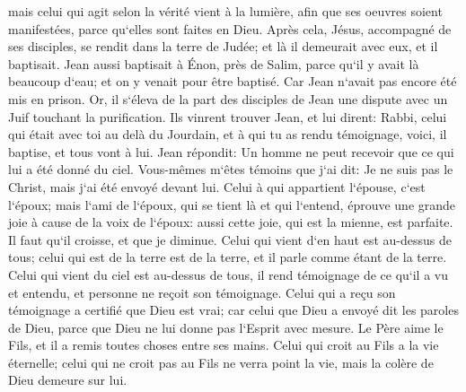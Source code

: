 \verse mais celui qui agit selon la vérité vient à la lumière, afin que ses oeuvres soient manifestées, parce qu`elles sont faites en Dieu. 
\verse Après cela, Jésus, accompagné de ses disciples, se rendit dans la terre de Judée; et là il demeurait avec eux, et il baptisait. 
\verse Jean aussi baptisait à Énon, près de Salim, parce qu`il y avait là beaucoup d`eau; et on y venait pour être baptisé. 
\verse Car Jean n`avait pas encore été mis en prison. 
\verse Or, il s`éleva de la part des disciples de Jean une dispute avec un Juif touchant la purification. 
\verse Ils vinrent trouver Jean, et lui dirent: Rabbi, celui qui était avec toi au delà du Jourdain, et à qui tu as rendu témoignage, voici, il baptise, et tous vont à lui. 
\verse Jean répondit: Un homme ne peut recevoir que ce qui lui a été donné du ciel. 
\verse Vous-mêmes m`êtes témoins que j`ai dit: Je ne suis pas le Christ, mais j`ai été envoyé devant lui. 
\verse Celui à qui appartient l`épouse, c`est l`époux; mais l`ami de l`époux, qui se tient là et qui l`entend, éprouve une grande joie à cause de la voix de l`époux: aussi cette joie, qui est la mienne, est parfaite. 
\verse Il faut qu`il croisse, et que je diminue. 
\verse Celui qui vient d`en haut est au-dessus de tous; celui qui est de la terre est de la terre, et il parle comme étant de la terre. Celui qui vient du ciel est au-dessus de tous, 
\verse il rend témoignage de ce qu`il a vu et entendu, et personne ne reçoit son témoignage. 
\verse Celui qui a reçu son témoignage a certifié que Dieu est vrai; 
\verse car celui que Dieu a envoyé dit les paroles de Dieu, parce que Dieu ne lui donne pas l`Esprit avec mesure. 
\verse Le Père aime le Fils, et il a remis toutes choses entre ses mains. 
\verse Celui qui croit au Fils a la vie éternelle; celui qui ne croit pas au Fils ne verra point la vie, mais la colère de Dieu demeure sur lui. 

